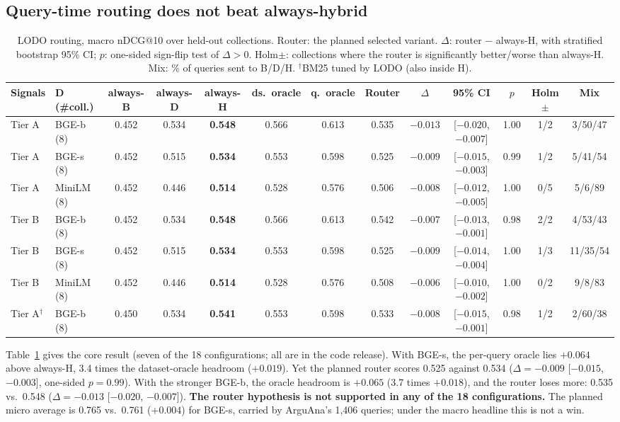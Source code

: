 \documentclass[conference]{IEEEtran}
\makeatletter
\newcommand{\B}{\textsc{B}}
\newcommand{\Dn}{\textsc{D}}
\newcommand{\Hy}{\textsc{H}}
\newcommand{\ndcg}{nDCG@10}
\makeatother
\begin{document}
\subsection{Query-time routing does not beat always-hybrid}
\begin{table}[t]
\centering
\caption{LODO routing, macro \ndcg{} over held-out collections. Router: the planned selected variant. $\Delta$: router $-$ always-\Hy, with stratified bootstrap 95\% CI; $p$: one-sided sign-flip test of $\Delta>0$. Holm$\pm$: collections where the router is significantly better/worse than always-\Hy. Mix: \% of queries sent to \B/\Dn/\Hy. $^\dagger$BM25 tuned by LODO (also inside \Hy).}
\label{tab:router}
\footnotesize
\setlength{\tabcolsep}{3.6pt}
\begin{tabular}{@{}llccccccccccc@{}}
\toprule
Signals & \Dn{} (\#coll.) & always-\B & always-\Dn & always-\Hy & ds.\ oracle & q.\ oracle & Router & $\Delta$ & 95\% CI & $p$ & Holm$\pm$ & Mix \\
\midrule
Tier A & BGE-b (8)  & 0.452 & 0.534 & \textbf{0.548} & 0.566 & 0.613 & 0.535 & $-0.013$ & [$-0.020$, $-0.007$] & 1.00 & 1/2 & 3/50/47 \\
Tier A & BGE-s (8)  & 0.452 & 0.515 & \textbf{0.534} & 0.553 & 0.598 & 0.525 & $-0.009$ & [$-0.015$, $-0.003$] & 0.99 & 1/2 & 5/41/54 \\
Tier A & MiniLM (8) & 0.452 & 0.446 & \textbf{0.514} & 0.528 & 0.576 & 0.506 & $-0.008$ & [$-0.012$, $-0.005$] & 1.00 & 0/5 & 5/6/89 \\
Tier B & BGE-b (8)  & 0.452 & 0.534 & \textbf{0.548} & 0.566 & 0.613 & 0.542 & $-0.007$ & [$-0.013$, $-0.001$] & 0.98 & 2/2 & 4/53/43 \\
Tier B & BGE-s (8)  & 0.452 & 0.515 & \textbf{0.534} & 0.553 & 0.598 & 0.525 & $-0.009$ & [$-0.014$, $-0.004$] & 1.00 & 1/3 & 11/35/54 \\
Tier B & MiniLM (8) & 0.452 & 0.446 & \textbf{0.514} & 0.528 & 0.576 & 0.508 & $-0.006$ & [$-0.010$, $-0.002$] & 1.00 & 0/2 & 9/8/83 \\
Tier A$^\dagger$ & BGE-b (8) & 0.450 & 0.534 & \textbf{0.541} & 0.553 & 0.598 & 0.533 & $-0.008$ & [$-0.015$, $-0.001$] & 0.98 & 1/2 & 2/60/38 \\
\bottomrule
\end{tabular}
\end{table}

Table~\ref{tab:router} gives the core result (seven of the 18 configurations; all are in the code release). With BGE-s, the per-query oracle lies $+0.064$ above always-\Hy, 3.4 times the dataset-oracle headroom ($+0.019$). Yet the planned router scores 0.525 against 0.534 ($\Delta=-0.009$ [$-0.015$, $-0.003$], one-sided $p=0.99$). With the stronger BGE-b, the oracle headroom is $+0.065$ (3.7 times $+0.018$), and the router loses more: 0.535 vs.\ 0.548 ($\Delta=-0.013$ [$-0.020$, $-0.007$]). \textbf{The router hypothesis is not supported in any of the 18 configurations.} The planned micro average is 0.765 vs.\ 0.761 ($+0.004$) for BGE-s, carried by ArguAna's 1,406 queries; under the macro headline this is not a win.
\end{document}
